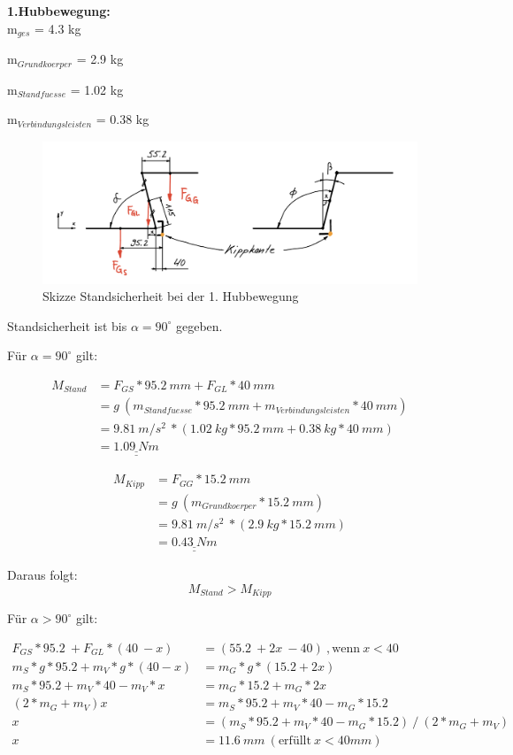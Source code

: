 \textbf{1.Hubbewegung:}\\

m$_{ges}$ = 4.3 kg

m$_{Grundkoerper}$ = 2.9 kg

m$_{Standfuesse}$ = 1.02 kg

m$_{Verbindungsleisten}$ = 0.38 kg\\

\begin{figure}[H]
  \includegraphics[width=1\textwidth]{img/Treppensteigen/Standsicherheit 1.Hub.png}
  \centering
  \caption{Skizze Standsicherheit bei der 1. Hubbewegung}
  \label{fig:standsicherheit-1-hubbewegung}
\end{figure}

Standsicherheit ist bis \({\alpha} = 90^\circ\) gegeben.

Für \({\alpha} = 90^\circ\) gilt:


\begin{align*}
    M_{Stand} &= F_{GS} * 95.2\ mm + F_{GL} * 40\ mm \\
    &= g\ (m_{Standfuesse} * 95.2\ mm + m_{Verbindungsleisten} * 40\ mm) \\
    &= 9.81\ m/s^2\ * (1.02\ kg * 95.2\ mm + 0.38\ kg * 40\ mm) \\
    &= \underline{\underline{1.09\ Nm}}
\end{align*}

\begin{align*}
    M_{Kipp} &= F_{GG} * 15.2\ mm \\
    &= g\ (m_{Grundkoerper} * 15.2\ mm) \\
    &= 9.81\ m/s^2\ * (2.9\ kg * 15.2\ mm) \\
    &= \underline{\underline{0.43\ Nm}}
\end{align*}

Daraus folgt:
\[M_{Stand} > M_{Kipp}\]

Für \({\alpha} > 90^\circ\) gilt:

\begin{align*}
    F_{GS} * 95.2\ + F_{GL} * (40\ - x) &= (55.2\ + 2x\ - 40)\ ,\text{wenn}\ x < 40 \\
    m_{S} * g * 95.2 + m_{V} * g * (40 - x) &= m_{G} * g * (15.2 + 2x) \\
    m_{S} * 95.2 + m_{V} * 40 - m_{V} * x &= m_{G} * 15.2 + m_{G} * 2x \\
    (2 * m_{G} + m_{V}) x &= m_{S} * 95.2 + m_{V} * 40 - m_{G} * 15.2 \\
    x &= (m_{S} * 95.2 + m_{V} * 40 - m_{G} * 15.2)\ /\ (2 * m_{G} + m_{V}) \\
    x &= 11.6\ mm\ (\text{erfüllt}\ x < 40 mm)
\end{align*}


